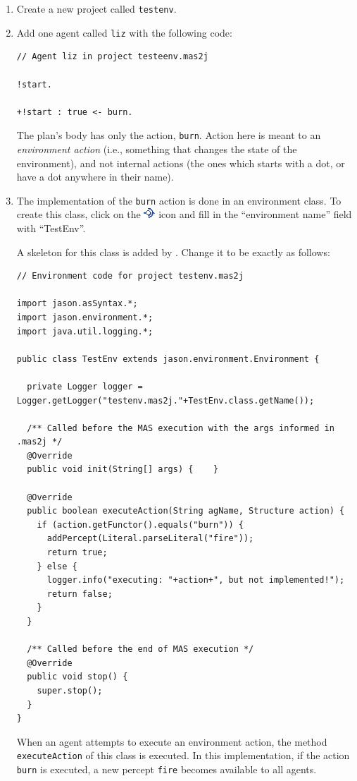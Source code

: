 \documentclass[a4paper]{article}
\newcommand{\Jason}[0]{\htlink{\textit{\textbf{Jason}}}{http://jason.sf.net}\xspace}
\begin{document}
\begin{enumerate}
\item Create a new project called \texttt{testenv}.
\item Add one agent called \texttt{liz} with the following code:
\begin{verbatim}
// Agent liz in project testeenv.mas2j

!start.

+!start : true <- burn.
\end{verbatim}

  The plan's body has only the action, \texttt{burn}. Action here is
  meant to an \emph{environment action} (i.e., something that changes
  the state of the environment), and not internal actions (the ones
  which starts with a dot, or have a dot anywhere in their name).

\item The implementation of the \texttt{burn} action is done in an environment
  class. To create this class, click on the
  \includegraphics{figures/createEnv} icon and fill in the ``environment name''
  field with ``TestEnv''.  

  A skeleton for this class is added by \Jason. Change it to be
  exactly as follows:
\begin{verbatim}
// Environment code for project testenv.mas2j

import jason.asSyntax.*;
import jason.environment.*;
import java.util.logging.*;

public class TestEnv extends jason.environment.Environment {

  private Logger logger = Logger.getLogger("testenv.mas2j."+TestEnv.class.getName());

  /** Called before the MAS execution with the args informed in .mas2j */
  @Override
  public void init(String[] args) {    }

  @Override
  public boolean executeAction(String agName, Structure action) {
    if (action.getFunctor().equals("burn")) {
      addPercept(Literal.parseLiteral("fire"));
      return true;
    } else {
      logger.info("executing: "+action+", but not implemented!");
      return false;
    }
  }

  /** Called before the end of MAS execution */
  @Override
  public void stop() {
    super.stop();
  }
}
\end{verbatim}

  When an agent attempts to execute an environment action, the method
  \texttt{executeAction} of this class is executed. In this
  implementation, if the action \texttt{burn} is executed, a new
  percept \texttt{fire} becomes available to all agents.


\end{enumerate}
\end{document}
